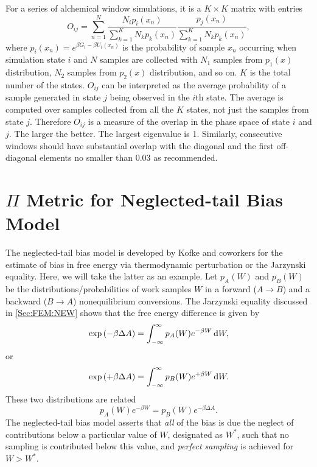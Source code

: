 For a series of alchemical window simulations, it is a $K \times K$ matrix with entries
\begin{equation}
O_{ij}=\sum\limits_{n=1}^{N}\frac{N_{i}p_{i}(x_{n})}{\sum\limits_{k=1}^{K}N_{k}p_{k}(x_{n})}\frac{p_{j}(x_{n})}{\sum\limits_{k=1}^{K}N_{k}p_{k}(x_{n})},
\end{equation}
where $p_{i}(x_{n})=e^{\beta G_{i}-\beta U_{i}(x_{n})}$ is the probability of sample $x_{n}$ occurring when simulation state $i$ and $N$ samples are collected with $N_{1}$ samples from $p_{1}(x)$ distribution, $N_{2}$ samples from $p_{2}(x)$ distribution, and so on. $K$ is the total number of the states. $O_{ij}$ can be interpreted as the average probability of a sample generated in state $j$ being observed in the $i$th state. The average is computed over samples collected from all the $K$ states, not just the samples from state $j$. Therefore $O_{ij}$ is a measure of the overlap in the phase space of state $i$ and $j$. The larger the better. The largest eigenvalue is 1.
Similarly, consecutive windows should have substantial overlap with the diagonal and the first off-diagonal elements no smaller than 0.03 as recommended\cite{KlimovichJCAMD2015}. 

\section{\texorpdfstring{$\Pi$ Metric for Neglected-tail Bias Model}{Π Metric for Neglected-tail Bias Model}\label{Sec:Eva:Pi}}
The neglected-tail bias model is developed by Kofke and coworkers for the estimate of bias in free energy via thermodynamic perturbation or the Jarzynski equality\cite{LuJCP2001,WuJCP2004}. Here, we will take the latter as an example. Let $p_A(W)$ and $p_B(W)$ be the distributions/probabilities of work samples $W$ in a forward ($A\to B$) and a backward ($B\to A$) nonequilibrium conversions. The Jarzynski equality discussed in \ref{Sec:FEM:NEW} shows that the free energy difference is given by
\begin{equation}
    \exp{(-\beta \Delta A)}=\int_{-\infty}^{\infty}p_A(W)e^{-\beta W}\mathop{}\!\mathrm{d} W,
\end{equation}
or
\begin{equation}
    \exp{(+\beta \Delta A)}=\int_{-\infty}^{\infty}p_B(W)e^{+\beta W}\mathop{}\!\mathrm{d} W.
\end{equation}
These two distributions are related
\begin{equation}
    p_A(W)e^{-\beta W}=p_B(W)e^{-\beta \Delta A}.
    \label{Eq:Eva:Pi:distributions_and_dA}
\end{equation}
The neglected-tail bias model asserts that \emph{all} of the bias is due the neglect of contributions below a particular value of $W$, designated as $W^\ast$, such that no sampling is contributed below this value, and \emph{perfect sampling} is achieved for $W>W^\ast$.


